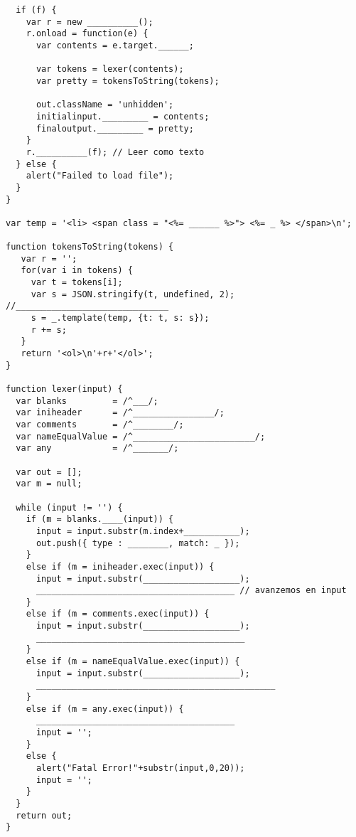 \begin{enumerate}
\begin{verbatim}
  if (f) {
    var r = new __________();
    r.onload = function(e) { 
      var contents = e.target.______;
      
      var tokens = lexer(contents);
      var pretty = tokensToString(tokens);
      
      out.className = 'unhidden';
      initialinput._________ = contents;
      finaloutput._________ = pretty;
    }
    r.__________(f); // Leer como texto
  } else { 
    alert("Failed to load file");
  }
}

var temp = '<li> <span class = "<%= ______ %>"> <%= _ %> </span>\n';

function tokensToString(tokens) {
   var r = '';
   for(var i in tokens) {
     var t = tokens[i];
     var s = JSON.stringify(t, undefined, 2); //______________________________
     s = _.template(temp, {t: t, s: s});
     r += s;
   }
   return '<ol>\n'+r+'</ol>';
}

function lexer(input) {
  var blanks         = /^___/;
  var iniheader      = /^________________/;
  var comments       = /^________/;
  var nameEqualValue = /^________________________/;
  var any            = /^_______/;

  var out = [];
  var m = null;

  while (input != '') {
    if (m = blanks.____(input)) {
      input = input.substr(m.index+___________);
      out.push({ type : ________, match: _ });
    }
    else if (m = iniheader.exec(input)) {
      input = input.substr(___________________);
      _______________________________________ // avanzemos en input
    }
    else if (m = comments.exec(input)) {
      input = input.substr(___________________);
      _________________________________________
    }
    else if (m = nameEqualValue.exec(input)) {
      input = input.substr(___________________);
      _______________________________________________
    }
    else if (m = any.exec(input)) {
      _______________________________________
      input = '';
    }
    else {
      alert("Fatal Error!"+substr(input,0,20));
      input = '';
    }
  }
  return out;
}
\end{verbatim}
\end{enumerate}

